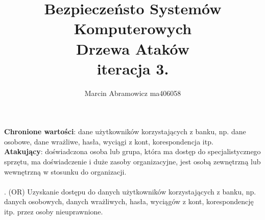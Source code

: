 \documentclass[10pt,a4paper,twoside]{article}
\title{\vspace{-1cm}
    Bezpieczeństo Systemów Komputerowych \\
    \large Drzewa Ataków \\
    \small iteracja 3.
}
\author{
    Marcin Abramowicz ma406058
}
\begin{document}
    \maketitle


    \textbf{Chronione wartości}: dane użytkowników korzystających z banku, np.
    dane osobowe, dane wrażliwe, hasła, wyciągi z kont, korespondencja itp. \\

    \textbf{Atakujący}: doświadczona osoba lub grupa, która ma dostęp do
    specjalistycznego sprzętu, ma doświadczenie i duże zasoby
    organizacyjne, jest osobą zewnętrzną lub wewnętrzną w stosunku do organizacji. \\ \\

    . (OR) Uzyskanie dostępu do danych użytkowników korzystających z banku, np.
        danych osobowych, danych wrażliwych, hasła, wyciągów z kont, korespondencję itp.
        przez osoby nieuprawnione.
\end{document}
